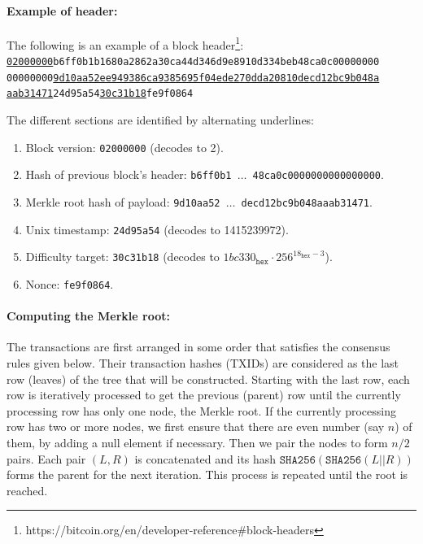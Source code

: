 \documentclass[]{report}   %
\begin{document}
\paragraph{Example of header:} The following is an example of a block header\footnote{https://bitcoin.org/en/developer-reference\#block-headers}:\\
\texttt{\underline{02000000}b6ff0b1b1680a2862a30ca44d346d9e8910d334beb48ca0c00000000}\\
\texttt{00000000\underline{9d10aa52ee949386ca9385695f04ede270dda20810decd12bc9b048a}}\\
\texttt{\underline{aab31471}24d95a54\underline{30c31b18}fe9f0864}

The different sections are identified by alternating underlines:
\begin{enumerate}
	\item Block version: \texttt{02000000} (decodes to 2).
	\item Hash of previous block's header: \texttt{b6ff0b1 $\ldots$ 48ca0c0000000000000000}.
	\item Merkle root hash of payload: \texttt{9d10aa52 $\ldots$    decd12bc9b048aaab31471}.
	\item Unix timestamp: \texttt{24d95a54} (decodes to 1415239972).
	\item Difficulty target: \texttt{30c31b18} (decodes to $1bc330_{\texttt{hex}} \cdot 256^{18_{\texttt{hex}}-3}$).
	\item Nonce: \texttt{fe9f0864}.
\end{enumerate}
	
\paragraph{Computing the Merkle root:} The transactions are first arranged in some order that satisfies the consensus rules given below. Their transaction hashes (TXIDs) are considered as the last row (leaves) of the tree that will be constructed. Starting with the last row, each row is iteratively processed to get the previous (parent) row until the currently processing row has only one node, the Merkle root. 
If the currently processing row has two or more nodes, we first ensure that there are even number (say $n$) of them, by adding a null element if necessary. Then we pair the nodes to form $n/2$ pairs. Each pair $(L, R)$ is concatenated and its hash $\texttt{SHA256}(\texttt{SHA256}(L||R))$ forms the parent for the next iteration. This process is repeated until the root is reached. 
\end{document}
